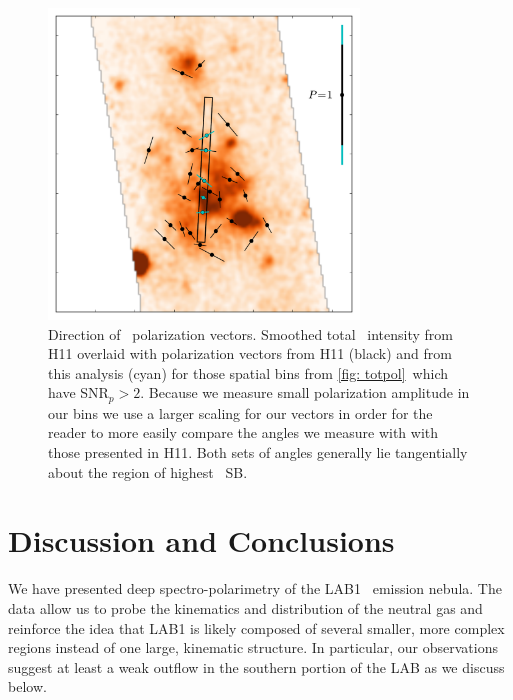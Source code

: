 \begin{figure}[t]
\begin{center}
\includegraphics[width=3.25in]{Figures/lyapol/f6_v2.pdf}
\caption[Direction of polarization vectors]{Direction of \lya~polarization vectors. Smoothed total \lya~intensity from H11 overlaid with polarization vectors from H11 (black) and from this analysis (cyan) for those spatial bins from \autoref{fig: totpol}~which have SNR$_p > 2$. Because we measure small polarization amplitude in our bins we use a larger scaling for our vectors in order for the reader to more easily compare the angles we measure with with those presented in H11. Both sets of angles generally lie tangentially about the region of highest \lya~SB.}
\label{fig: angles}
\end{center}
\end{figure}

\section{Discussion and Conclusions}\label{sec: interp}

We have presented deep spectro-polarimetry of  the LAB1 \lya~emission nebula. The data allow us to probe the kinematics and distribution of the neutral gas and reinforce the idea that LAB1 is likely composed of several smaller, more complex regions instead of one large, kinematic structure. In particular, our observations suggest at least a weak outflow in the southern portion of the LAB as we discuss below.

